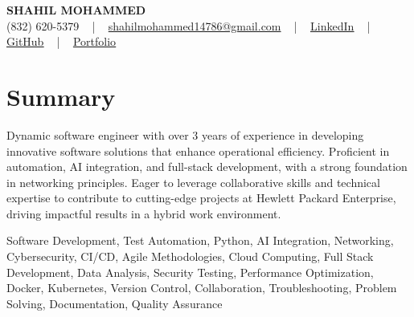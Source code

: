 \documentclass[letterpaper,10pt]{article}
\begin{document}
\begin{center}
    {\fontsize{14pt}{12pt}\selectfont \textbf{\MakeUppercase{Shahil Mohammed}}}\\ \vspace{2pt}
    \fontsize{10pt}{12pt}\selectfont (832) 620-5379 ~ | ~ \href{mailto:shahilmohammed14786@gmail.com}{shahilmohammed14786@gmail.com} ~ | ~  
    \href{https://www.linkedin.com/in/shahil-mohammed-9652931a1/}{\color{blue}\underline{LinkedIn}}  ~ | ~ 
    \href{https://github.com/freakbeast14}{\color{blue}\underline{GitHub}} ~ | ~ 
    \href{https://shahil-mohammed.netlify.app/}{\color{blue}\underline{Portfolio}}
    \vspace{-8pt}
\end{center}

\section{Summary}
\vspace{-2pt}\fontsize{8pt}{9pt}\selectfont
Dynamic software engineer with over 3 years of experience in developing innovative software solutions that enhance operational efficiency. Proficient in automation, AI integration, and full-stack development, with a strong foundation in networking principles. Eager to leverage collaborative skills and technical expertise to contribute to cutting-edge projects at Hewlett Packard Enterprise, driving impactful results in a hybrid work environment.
 \vspace{-5pt}
 
{\fontsize{1pt}{1pt}\selectfont\color{white}
Software Development, Test Automation, Python, AI Integration, Networking, Cybersecurity, CI/CD, Agile Methodologies, Cloud Computing, Full Stack Development, Data Analysis, Security Testing, Performance Optimization, Docker, Kubernetes, Version Control, Collaboration, Troubleshooting, Problem Solving, Documentation, Quality Assurance
}
\vspace{-8pt}

\vspace{-2pt}
\end{document}

